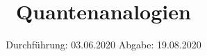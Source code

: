 

\subject{V 23}
\title{Quantenanalogien}
\date{%
  Durchführung: 03.06.2020
  \hspace{3em}
  Abgabe: 19.08.2020
}



\maketitle
\thispagestyle{empty}
\tableofcontents
\newpage







\printbibliography{}


